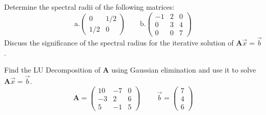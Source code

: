 \documentclass[12pt, answers]{exam}
\newcommand{\ve}[1]{\ensuremath{\mathbf{#1}}}
\begin{document}
\begin{questions}
\vspace*{3em}
\addpoints
\question[10] Determine the spectral radii of the following matrices:
%
\begin{equation}
\text{a.} \begin{pmatrix}
   0   & 1/2 \\
   1/2 &  0  
\end{pmatrix} \qquad
%
\text{b.} \begin{pmatrix}
  -1 &  2 & 0 \\
   0 &  3 & 4 \\
   0 &  0 & 7
\end{pmatrix} \nonumber
\end{equation}
%
Discuss the significance of the spectral radius for the iterative solution of $\ve{A}\vec{x} = \vec{b}$.


\vspace*{3em}
\addpoints
\question[10] Find the LU Decomposition of $\ve{A}$ using Gaussian elimination and use it to solve $\ve{A}\vec{x} = \vec{b}$.
%
\begin{equation}
\ve{A} = \begin{pmatrix}
  10 & -7 & 0 \\
  -3 &  2 & 6 \\
   5 & -1 & 5
\end{pmatrix} \; \qquad
%
\vec{b} = \begin{pmatrix} 7 \\ 4 \\ 6 \end{pmatrix} \nonumber
\end{equation}

\begin{solution}

\end{solution}

\end{questions}
\end{document}
